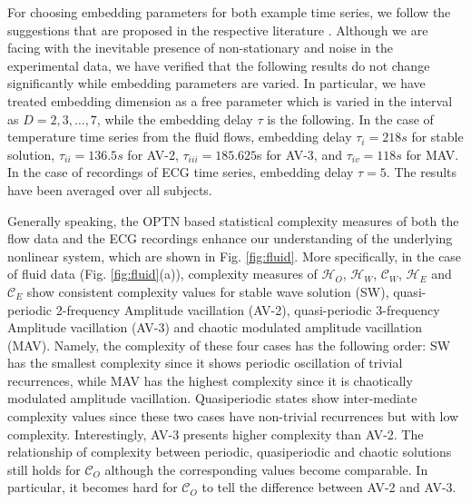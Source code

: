 \documentclass[12pt,aip,cha,reprint,nofootinbib]{revtex4-1}
\begin{document}
For choosing embedding parameters for both example time series, we follow the suggestions that are proposed in the respective literature \cite{ZouEPJST2008,smallCSF2002}. Although we are facing with the inevitable presence of non-stationary and noise in the experimental data, we have verified that the following results do not change significantly while embedding parameters are varied. In particular, we have treated embedding dimension as a free parameter which is varied in the interval as $D = 2, 3, \dots, 7$, while the embedding delay $\tau$ is the following. In the case of temperature time series from the fluid flows, embedding delay $\tau_{i} = 218s$ for stable solution, $\tau_{ii} = 136.5s$  for AV-2, $\tau_{iii} = 185.625$s for AV-3, and $\tau_{iv} = 118s$ for MAV. In the case of recordings of ECG time series, embedding delay $\tau = 5$. The results have been averaged over all subjects. 

Generally speaking, the OPTN based statistical complexity measures of both the flow data and the ECG recordings enhance our understanding of the underlying nonlinear system, which are shown in Fig. \ref{fig:fluid}. More specifically, in the case of fluid data (Fig. \ref{fig:fluid}(a)), complexity measures of $\mathcal{H}_O$, $\mathcal{H}_W$, $\mathcal{C}_W$, $\mathcal{H}_E$ and $\mathcal{C}_E$ show consistent complexity values for stable wave solution (SW), quasi-periodic 2-frequency Amplitude vacillation (AV-2), quasi-periodic 3-frequency Amplitude vacillation (AV-3) and chaotic modulated amplitude vacillation (MAV). Namely, the complexity of these four cases has the following order: SW has the smallest complexity since it shows periodic oscillation of trivial recurrences, while MAV has the highest complexity since it is chaotically modulated amplitude vacillation. Quasiperiodic states show inter-mediate complexity values since these two cases have non-trivial recurrences but with low complexity. Interestingly, AV-3 presents higher complexity than AV-2. The relationship of complexity between periodic, quasiperiodic and chaotic solutions still holds for $\mathcal{C}_O$ although the corresponding values become comparable. In particular, it becomes hard for $\mathcal{C}_O$ to tell the difference between AV-2 and AV-3. 
\end{document}
